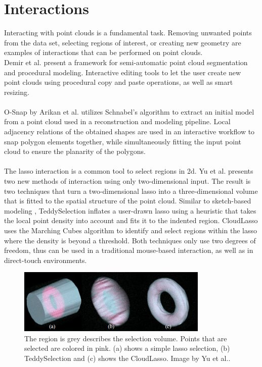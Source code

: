 \section {Interactions}
\label{sec:related_work_interactions}

Interacting with point clouds is a fundamental task. Removing unwanted points from the data set, selecting regions of interest, or creating new geometry are examples of interactions that can be performed on point clouds. 
\\
Demir et al. \cite{demir2015procedural} present a framework for semi-automatic point cloud segmentation and procedural modeling. Interactive editing tools to let the user create new point clouds using procedural copy and paste operations, as well as smart resizing. 
\\
\\
O-Snap by Arikan et al. \cite{arikan-2013-osn} utilizes Schnabel's algorithm to extract an initial model from a point cloud used in a reconstruction and modeling pipeline. Local adjacency relations of the obtained shapes are used in an interactive workflow to snap polygon elements together, while simultaneously fitting the input point cloud to ensure the planarity of the polygons. 
\\
\\
The lasso interaction is a common tool to select regions in 2d. Yu et al. \cite{yu2012efficient} presents two new methods of interaction using only two-dimensional input. The result is two techniques that turn a two-dimensional lasso into a three-dimensional volume that is fitted to the spatial structure of the point cloud. Similar to sketch-based modeling \cite{igarashi2007teddy}, TeddySelection inflates a user-drawn lasso using a heuristic that takes the local point density into account and fits it to the indented region. CloudLasso uses the Marching Cubes algorithm \cite{lorensen1987marching} to identify and select regions within the lasso where the density is beyond a threshold. Both techniques only use two degrees of freedom, thus can be used in a traditional mouse-based interaction, as well as in direct-touch environments. 

\begin{figure}[h]
    \centering
    \includegraphics[width=0.81\textwidth]{Related_Work/teddyCloudSelection.png}%
    \caption{The region is grey describes the selection volume. Points that are selected are colored in pink. (a) shows a simple lasso selection, (b) TeddySelection and (c) shows the CloudLasso. Image by Yu et al.\cite{yu2012efficient}.}
    \label{fig:teddyCloudSelection}
\end{figure}

